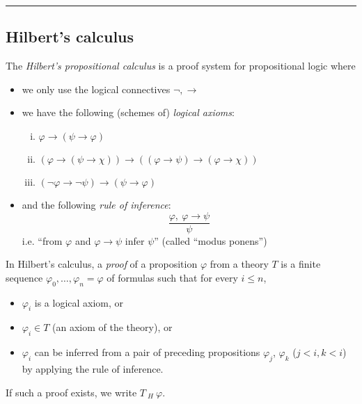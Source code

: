 \documentclass{amsart}
\theoremstyle{definition}
\begin{document}
\bigskip

\hrule

\bigskip


\subsection*{Hilbert's calculus}
The \emph{Hilbert's propositional calculus} is a proof system for propositional logic where 
\begin{itemize}
    \item we only use the logical connectives $\neg,\to$
    \item we have the following (schemes of) \emph{logical axioms}:
    \begin{enumerate}[(i)]
        \item $\varphi \to (\psi \to \varphi)$
        \item $(\varphi\to (\psi \to \chi)) \to ((\varphi \to \psi)\to(\varphi \to \chi))$
        \item $(\neg \varphi \to \neg \psi)\to(\psi \to \varphi)$
    \end{enumerate}
    \item and the following \emph{rule of inference}:
    $$\frac{\varphi,\ \varphi \to \psi}{\psi}$$
    i.e. ``from $\varphi$ and $\varphi\to\psi$ infer $\psi$'' (called ``modus ponens'')
\end{itemize}
In Hilbert's calculus, a \emph{proof} of a proposition $\varphi$ from a theory $T$ is a finite sequence $\varphi_0,\dots,\varphi_n=\varphi$ of formulas such that for every $i\leq n$,
\begin{itemize}
\item $\varphi_i$ is a logical axiom, or 
\item $\varphi_i \in T$ (an axiom of the theory), or
\item $\varphi_i$ can be inferred from a pair of preceding propositions $\varphi_j$, $\varphi_k$ ($j<i,k<i$) by applying the rule of inference.
\end{itemize}
If such a proof exists, we write $T\ _H\ \varphi$.
\end{document}
